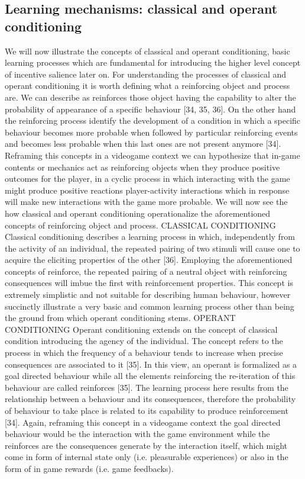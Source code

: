 \subsection{Learning mechanisms: classical and operant conditioning}
\label{classical_operant_cond}
We will now illustrate the concepts of classical and operant conditioning, basic learning processes which are fundamental for introducing the higher level concept of incentive salience later on. For understanding the processes of classical and operant conditioning it is worth defining what a reinforcing object and process are. We can describe as reinforces those object having the capability to alter the probability of appearance of a specific behaviour [34, 35, 36].  On the other hand the reinforcing process identify the development of a condition in which a specific behaviour becomes more probable when followed by particular reinforcing events and becomes less probable when this last ones are not present anymore [34]. Reframing this concepts in a videogame context we can hypothesize that in-game contents or mechanics act as reinforcing objects when they produce positive outcomes for the player, in a cyclic process in which interacting with the game might produce positive reactions player-activity interactions which in response will make new interactions with the game more probable. 
We will now see the how classical and operant conditioning operationalize the aforementioned concepts of reinforcing object and process.
CLASSICAL CONDITIONING
Classical conditioning describes a learning process in which, independently from the activity of an individual, the repeated pairing of two stimuli will cause one to acquire the eliciting properties of the other [36]. Employing the aforementioned concepts of reinforce, the repeated pairing of a neutral object with reinforcing consequences will imbue the first with reinforcement properties. This concept is extremely simplistic and not suitable for describing human behaviour, however succinctly illustrate a very basic and common learning process other than being the ground from which operant conditioning stems.
OPERANT CONDITIONING
Operant conditioning extends on the concept of classical condition introducing the agency of the individual. The concept refers to the process in which the frequency of a behaviour tends to increase when precise consequences are associated to it [35]. In this view, an operant is formalized as a goal directed behaviour while all the elements reinforcing the re-iteration of this behaviour are called reinforces [35]. The learning process here results from the relationship between a behaviour and its consequences, therefore the probability of behaviour to take place is related to its capability to produce reinforcement [34]. Again, reframing this concept in a videogame context the goal directed behaviour would be the interaction with the game environment while the reinforces are the consequences generate by the interaction itself, which might come in form of internal state only (i.e. pleasurable experiences) or also in the form of in game rewards (i.e. game feedbacks). 

